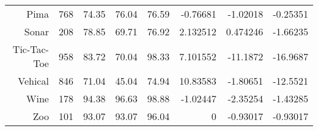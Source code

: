 \documentclass[11pt,fleqn]{article}
\begin{document}
\begin{enumerate}
\begin{tabular}{rrrrrrrr}
      Pima &        768 &      74.35 &      76.04 &      76.59 &   -0.76681 &   -1.02018 &   -0.25351 \\

     Sonar &        208 &      78.85 &      69.71 &      76.92 &   2.132512 &   0.474246 &   -1.66235 \\

Tic-Tac-Toe &        958 &      83.72 &      70.04 &      98.33 &   7.101552 &   -11.1872 &   -16.9687 \\

   Vehical &        846 &      71.04 &      45.04 &      74.94 &   10.83583 &   -1.80651 &   -12.5521 \\

      Wine &        178 &      94.38 &      96.63 &      98.88 &   -1.02447 &   -2.35254 &   -1.43285 \\

       Zoo &        101 &      93.07 &      93.07 &      96.04 &          0 &   -0.93017 &   -0.93017 \\

\end{tabular}  


\end{enumerate}
\end{document}
